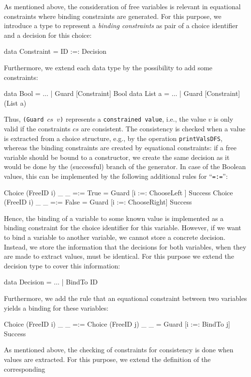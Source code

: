 \documentclass{llncs}
\newcommand{\code}[1]{\mbox{\small\texttt{#1}}}
\newcommand{\ccode}[1]{``\code{#1}''}
\begin{document}
As mentioned above, the consideration of free variables
is relevant in equational constraints where binding constraints are
generated. For this purpose, we introduce a type to represent
a \emph{binding constraints} as pair of a choice identifier
and a decision for this choice:
\begin{haskell}
  data Constraint = ID :=: Decision
\end{haskell}
Furthermore, we extend each data type by the possibility to
add some constraints:
\begin{haskell}
  data Bool   = $\ldots$ | Guard [Constraint] Bool
  data List a = $\ldots$ | Guard [Constraint] (List a)
\end{haskell}
Thus, \code{(Guard $cs$ $v$)} represents a \code{constrained value},
i.e., the value $v$ is only valid if the constraints $cs$ are
consistent. The consistency is checked when a value is extracted
from a choice structure, e.g., by the operation \code{printValsDFS},
whereas the binding constraints are created by
equational constraints: if a free variable
should be bound to a constructor, we create the same
decision as it would be done by the (successful) branch
of the generator. In case of the Boolean values,
this can be implemented by the following additional rules
for \ccode{=:=}:
\begin{haskell}
  Choice (FreeID i) _ _ =:= True   =  Guard [i :=: ChooseLeft ] Success
  Choice (FreeID i) _ _ =:= False  =  Guard [i :=: ChooseRight] Success
\end{haskell}
Hence, the binding of a variable to some known value
is implemented as a binding constraint for the choice identifier
for this variable. However, if we want to bind a variable
to another variable, we cannot store a concrete decision.
Instead, we store the information that the decisions for
both variables, when they are made to extract values,
must be identical. For this purpose we extend the decision
type to cover this information:
\begin{haskell}
  data Decision = $\ldots$ | BindTo ID
\end{haskell}
Furthermore, we add the rule that an equational constraint
between two variables yields a binding for these variables:
\begin{haskell}
  Choice (FreeID i) _ _ =:= Choice (FreeID j) _ _
    =  Guard [i :=: BindTo j] Success
\end{haskell}
%
As mentioned above, the checking of constraints
for consistency is done when values are extracted.
For this purpose, we extend the definition of the corresponding
\end{document}
